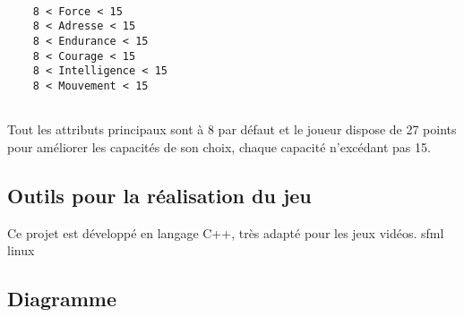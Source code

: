 \documentclass[a4paper,12pt]{report}
\begin{document}
	\begin{verbatim}

	8 < Force < 15 
	8 < Adresse < 15 
	8 < Endurance < 15
	8 < Courage < 15
	8 < Intelligence < 15
	8 < Mouvement < 15
	
	\end{verbatim}
	
	Tout les attributs principaux sont à 8 par défaut et le joueur dispose de 27 points pour améliorer les capacités de son choix, chaque capacité n'excédant pas 15.
	
	\subsection{Outils pour la réalisation du jeu}
	Ce projet est développé en langage C++, très adapté pour les jeux vidéos.
	sfml
	linux
	
	
	\subsection{Diagramme}
	
	
\end{document}
